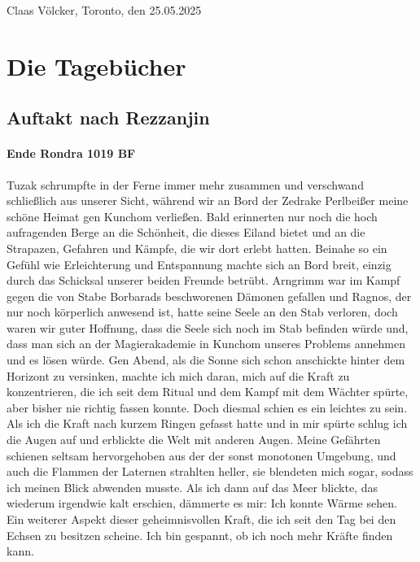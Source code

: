 \begin{flushright}
Claas Völcker, Toronto, den 25.05.2025
\end{flushright}


\section{Die Tagebücher}

\subsection{Auftakt nach Rezzanjin}

\paragraph{Ende Rondra 1019 BF}
Tuzak schrumpfte in der Ferne immer mehr zusammen und verschwand schließlich aus unserer Sicht, während wir an Bord der Zedrake Perlbeißer meine schöne Heimat gen Kunchom verließen. Bald erinnerten nur noch die hoch aufragenden Berge an die Schönheit, die dieses Eiland bietet und an die Strapazen, Gefahren und Kämpfe, die wir dort erlebt hatten. Beinahe so ein Gefühl wie Erleichterung und Entspannung machte sich an Bord breit, einzig durch das Schicksal unserer beiden Freunde betrübt. Arngrimm war im Kampf gegen die von Stabe Borbarads beschworenen Dämonen gefallen und Ragnos, der nur noch körperlich anwesend ist, hatte seine Seele an den Stab verloren, doch waren wir guter Hoffnung, dass die Seele sich noch im Stab befinden würde und, dass man sich an der Magierakademie in Kunchom unseres Problems annehmen und es lösen würde. Gen Abend, als die Sonne sich schon anschickte hinter dem Horizont zu versinken, machte ich mich daran, mich auf die Kraft zu konzentrieren, die ich seit dem Ritual und dem Kampf mit dem Wächter spürte, aber bisher nie richtig fassen konnte. Doch diesmal schien es ein leichtes zu sein. Als ich die Kraft nach kurzem Ringen gefasst hatte und in mir spürte schlug ich die Augen auf und erblickte die Welt mit anderen Augen. Meine Gefährten schienen seltsam hervorgehoben aus der der sonst monotonen Umgebung, und auch die Flammen der Laternen strahlten heller, sie blendeten mich sogar, sodass ich meinen Blick abwenden musste. Als ich dann auf das Meer blickte, das wiederum irgendwie kalt erschien, dämmerte es mir: Ich konnte Wärme sehen. Ein weiterer Aspekt dieser geheimnisvollen Kraft, die ich seit den Tag bei den Echsen zu besitzen scheine. Ich bin gespannt, ob ich noch mehr Kräfte finden kann.

